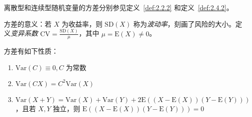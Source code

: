 \documentclass[../main.tex]{subfiles}
\begin{document}
离散型和连续型随机变量的方差分别参见定义~\ref{def:2.2.2} 和定义~\ref{def:2.4.2}。

方差的意义：若 $X$ 为收益率，则 $\mathrm{SD}(X)$ 称为\emph{波动率}，刻画了风险的大小。定义\emph{变异系数} $\mathrm{CV}=\frac{\mathrm{SD}(X)}{\mu}$，其中 $\mu=\mathrm E(X)\neq0$。

\begin{proposition}
    方差有如下性质：
    \begin{enumerate}
        \item $\mathrm{Var}(C)\equiv 0,C\text{ 为常数}$
        \item $\mathrm{Var}(CX)=C^2\mathrm{Var}(X)$
        \item $\mathrm{Var}(X+Y)=\mathrm{Var}(X)+\mathrm{Var}(Y)+2\mathrm{E}((X-\mathrm{E}(X))(Y-\mathrm{E}(Y)))$，且若 $X,Y$ 独立，则 $\mathrm{E}((X-\mathrm{E}(X))(Y-\mathrm{E}(Y)))=0$
    \end{enumerate}
\end{proposition}
\end{document}
